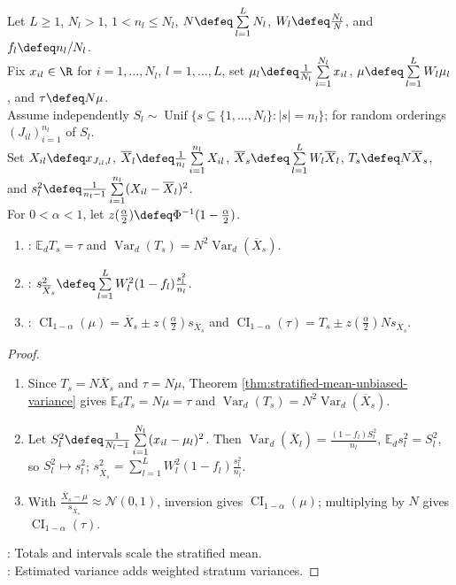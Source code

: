 \begin{corollary} \label{cor:stratified-total-and-estimated-variance} \\
Let $L\geq1$, $N_l>1$, $1<n_l\leq N_l$, $N\defeq\sum\limits_{l=1}^{L}N_l$, $W_l\defeq\frac{N_l}{N}$, and $f_l\defeq n_l/N_l$.\\
Fix $x_{il}\in\R$ for $i=1,\ldots,N_l$, $l=1,\ldots,L$, set $\mu_l\defeq\frac1{N_l}\sum\limits_{i=1}^{N_l}x_{il}$, $\mu\defeq\sum\limits_{l=1}^{L}W_l\mu_l$, and $\tau\defeq N\mu$.\\
Assume independently $S_l\sim\operatorname{Unif}\{s\subseteq\{1,\ldots,N_l\}:|s|=n_l\}$; for random orderings $(J_{il})_{i=1}^{n_l}$ of $S_l$.\\
Set $X_{il}\defeq x_{J_{il},l}$, $\overline{X}_l\defeq\frac1{n_l}\sum\limits_{i=1}^{n_l}X_{il}$, $\overline{X}_s\defeq\sum\limits_{l=1}^{L}W_l\overline{X}_l$, $T_s\defeq N\overline{X}_s$, and $s_l^2\defeq\frac1{n_l-1}\sum\limits_{i=1}^{n_l}(X_{il}-\overline{X}_l)^2$.\\
For $0<\alpha<1$, let $z(\frac{\alpha}{2})\defeq\Phi^{-1}(1-\frac{\alpha}{2})$.
\begin{enumerate}[label=(\roman*)]
\setlength{\itemsep}{0pt}
\item {}: $\mathbb{E}_dT_s=\tau$ and $\operatorname{Var}_d(T_s)=N^2\operatorname{Var}_d(\overline{X}_s)$.
\item {}: $s_{\overline{X}_s}^2\defeq\sum\limits_{l=1}^{L}W_l^2(1-f_l)\frac{s_l^2}{n_l}$.
\item {}: $\operatorname{CI}_{1-\alpha}(\mu)=\overline{X}_s\pm z(\frac{\alpha}{2})s_{\overline{X}_s}$ and $\operatorname{CI}_{1-\alpha}(\tau)=T_s\pm z(\frac{\alpha}{2})Ns_{\overline{X}_s}$.
\end{enumerate}
\begin{proof}
\begin{enumerate}[label=(\roman*)]
\setlength{\itemsep}{0pt}
\item Since $T_s=N\overline{X}_s$ and $\tau=N\mu$, Theorem \ref{thm:stratified-mean-unbiased-variance} gives $\mathbb{E}_dT_s=N\mu=\tau$ and $\operatorname{Var}_d(T_s)=N^2\operatorname{Var}_d(\overline{X}_s)$.
\item Let $S_l^2\defeq\frac{1}{N_l-1}\sum\limits_{i=1}^{N_l}(x_{il}-\mu_l)^2$. Then $\operatorname{Var}_d(\overline{X}_l)=\frac{(1-f_l)S_l^2}{n_l}$, $\mathbb{E}_d s_l^2=S_l^2$, so $S_l^2\mapsto s_l^2$; $s_{\overline{X}_s}^2=\sum\limits_{l=1}^{L}W_l^2(1-f_l)\frac{s_l^2}{n_l}$.
\item With $\frac{\overline{X}_s-\mu}{s_{\overline{X}_s}}\approx\mathcal{N}(0,1)$, inversion gives $\operatorname{CI}_{1-\alpha}(\mu)$; multiplying by $N$ gives $\operatorname{CI}_{1-\alpha}(\tau)$.
\end{enumerate}
: Totals and intervals scale the stratified mean.\\
: Estimated variance adds weighted stratum variances.
\end{proof}
\end{corollary}

